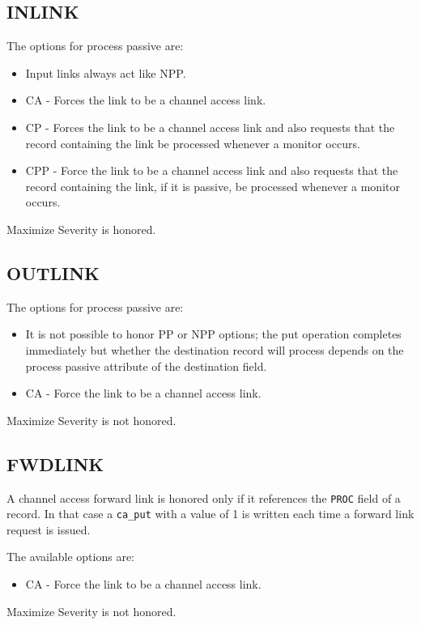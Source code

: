 \subsection{INLINK}

The options for process passive are:

\begin{itemize}
\item Input links always act like NPP.

\item CA - Forces the link to be a channel access link.

\item CP - Forces the link to be a channel access link and also requests that the record containing the link be processed whenever a monitor occurs.

\item CPP - Force the link to be a channel access link and also requests that the record containing the link, if it is passive, be processed whenever a monitor occurs.

\end{itemize}

Maximize Severity is honored.

\subsection{OUTLINK}

The options for process passive are:

\begin{itemize}
\item It is not possible to honor PP or NPP options; the put operation completes immediately but whether the destination record will process depends on the process passive attribute of the destination field.

\item CA - Force the link to be a channel access link.

\end{itemize}

Maximize Severity is not honored.

\subsection{FWDLINK}

A channel access forward link is honored only if it references the \verb|PROC| field of a record.
In that case a \verb|ca_put| with a value of 1 is written each time a forward link request is issued.

The available options are:

\begin{itemize}

\item CA - Force the link to be a channel access link.

\end{itemize}

Maximize Severity is not honored.


